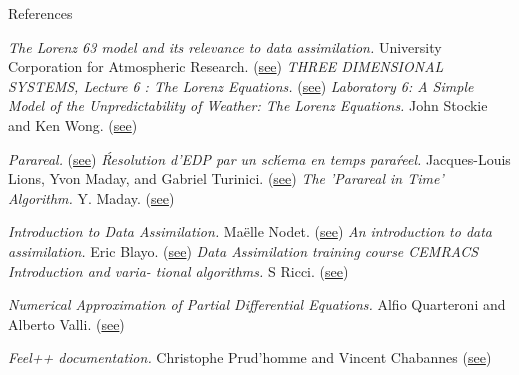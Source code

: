 \documentclass[10pt,xcolor={table,dvipsnames},t]{beamer}
\begin{document}
	\begin{frame}{References}
		\begin{thebibliography}{9}
			\footnotesize
			\textit{The Lorenz 63 model and its relevance to data assimilation.} University Corporation for Atmospheric Research. (\href{https://docs.dart.ucar.edu/en/latest/guide/lorenz-63-model.html}{see})
			\textit{THREE DIMENSIONAL SYSTEMS, Lecture 6 : The Lorenz Equations.} (\href{https://www2.physics.ox.ac.uk/sites/default/files/profiles/read/lect6-43147.pdf}{see})
			\textit{Laboratory 6: A Simple Model of the Unpredictability of Weather: The Lorenz Equations.} John Stockie and Ken Wong.  (\href{https://ftp.emc.ncep.noaa.gov/mmb/sref/Doc/lorenz_fcst.pdf}{see})	
			
			\textit{Parareal.}  (\href{https://en.wikipedia.org/w/index.php?title=Parareal&oldid=1047894968}{see})
			\textit{Ŕesolution d’EDP par un sch́ema en temps paraŕeel.} Jacques-Louis Lions, Yvon Maday, and Gabriel Turinici.   (\href{https://hal.archives-ouvertes.fr/hal-00798372/file/CRAS_01_lions_maday_turinici.pdf}{see})
			\textit{The ’Parareal in Time’ Algorithm.} Y. Maday.  (\href{https://www.ljll.math.upmc.fr/publications/2008/R08030.pdf}{see})
			
			\textit{Introduction to Data Assimilation.} Maëlle Nodet.   (\href{https://team.inria.fr/airsea/files/2012/03/Nodet_Intro_DataAssimilation.pdf}{see})
			\textit{An introduction to data assimilation. } Eric Blayo.  (\href{https://www.eccorev.fr/IMG/pdf/Assimilationdonnees_EBlayo.pdf}{see})
			\textit{Data Assimilation training course CEMRACS Introduction and varia-
			tional algorithms. } S Ricci.    (\href{http://smai.emath.fr/cemracs/cemracs16/images/DA_Ricci_
				CEMRACS2016.pdf}{see})
			
			\textit{Numerical Approximation of Partial Differential Equations.} Alfio Quarteroni and Alberto Valli.    (\href{https://link.springer.com/content/pdf/10.1007/978-3-540-85268-1.pdf}{see})
		
			\textit{Feel++ documentation.} Christophe Prud’homme and Vincent Chabannes   (\href{https://docs.feelpp.org/feelpp/0.109/index.html}{see})
			
			
		\end{thebibliography}
	\end{frame}
	
\end{document}
